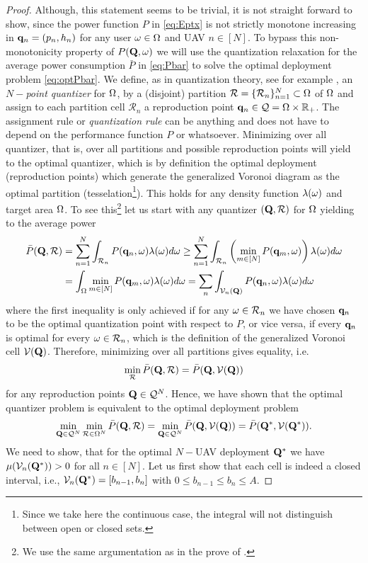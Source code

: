 \documentclass[smallabstract,smallcaptions]{dccpaper}
\newcounter{example}[section]
\newcommand{\Pbar}{\ensuremath{\bar{P}}}         %
\newcommand{\Vor}{\ensuremath{\mathcal{V}}}         %
\newcommand{\Rset}{\ensuremath{\mathcal R}}
\newcommand{\Qset}{\ensuremath{\mathcal Q}}
\begin{document}
\begin{proof}
  Although, this statement seems to be trivial, it is not straight forward to show, since the power function $P$ in
  \eqref{eq:Eptx} is not strictly monotone increasing in ${\mathbf q}_n=(p_n,h_n)$ for any user $\omega \in\Omega$ and UAV
  $n\in[N]$. To bypass this non-monotonicity property of $P(\mathbf Q,\omega)$ we will use the quantization relaxation for the
  average power consumption $\Pbar$ in \eqref{eq:Pbar} to  solve the optimal deployment problem \eqref{eq:optPbar}. We
  define, as in quantization theory, see for example \cite{GN98}, an \emph{$N-$point quantizer} for $\Omega$, by a
  (disjoint) partition $\Rset=\{\Rset_n\}_{n=1}^N\subset \Ome$ of $\Omega$ and assign to each partition cell $\Rset_n$ a
  reproduction point $\vq_n\in\Qset=\Ome\times\R_+$. The assignment rule or \emph{quantization rule} can be anything and
  does not have to depend on the performance function $P$ or whatsoever.  Minimizing over all quantizer, that is, over
  all partitions and possible reproduction points will yield to the optimal quantizer, which is by definition the
  optimal deployment (reproduction points) which generate the generalized Voronoi diagram as the optimal partition
  (tesselation\footnote{Since we take here the continuous case, the integral will not distinguish between open or closed
  sets.}). This holds for any density function $\lambda(\omega)$ and target area $\Omega$.  To see this\footnote{We use the
    same argumentation as in the prove of \cite[Prop.1]{KJ17}.} let us start with any quantizer $(\vQ,\Rset)$ for $\Omega$
    yielding to the average power 
  \begin{align}
    \Pbar(\vQ,\Rset) &=\sum_{n=1}^N \int_{\Rset_n} P(\vq_n,\ome)\lam(\ome) d\ome \geq \sum_{n=1}^N \int_{\Rset_n} 
    \left(\min_{m\in[N]} P(\vq_m,\ome) \right) \lam(\ome)d\ome\\
    &=\int_{\Ome} \min_{m\in[N]} P(\vq_m,\ome) \lam(\ome)d\ome
    =\sum_n \int_{\Vor_n(\vQ)} P(\vq_n,\ome) \lam(\ome)d\ome\notag
  \end{align} 
  where the first inequality is only achieved if for any $\ome\in \Rset_n$ we have chosen ${\mathbf q}_n$ to be the optimal
  quantization point with respect to $P$, or vice versa, if every ${\mathbf q}_n$ is optimal for every $\ome\in \Rset_n$, which is the
  definition of the generalized Voronoi cell $\Vor(\vQ)$. Therefore, minimizing over all partitions gives equality, i.e.
  \begin{align}
    \min_{\Rset} \Pbar(\vQ,\Rset)=\Pbar(\vQ,\Vor(\vQ))
  \end{align}
  for any reproduction points $\vQ\in\Qset^N$.
  Hence, we have shown that the optimal quantizer problem is equivalent to the optimal deployment problem
  \begin{align}
    \min_{\vQ\in\Qset^N} \min_{\Rset\in\Ome^N} \Pbar(\vQ,\Rset) = \min_{\vQ\in\Qset^N}
    \Pbar(\vQ,\Vor(\vQ))=\Pbar(\vQ^*,\Vor(\vQ^*)).\label{eq:optquanteqoptdeploy}
  \end{align}
  We need to show, that for the optimal $N-$UAV deployment $\mathbf Q^*$ we have $\mu(\Vor_n(\vQ^*))>0$ for all $n\in[N]$.
  Let us first show that each cell is indeed a closed interval, i.e., $\Vor_n(\vQ^*)=[b_{n-1},b_n]$ with $0\leq b_{n-1}\leq
  b_n\leq A$. 
  

\end{proof}
\end{document}

